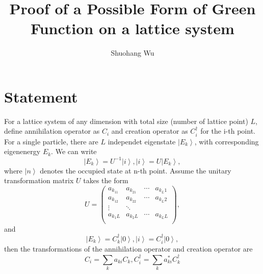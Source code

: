 \documentclass[prb,superscriptaddress,letter,10pt,onecolumn]{revtex4}
\begin{document}
\title{Proof of a Possible Form of Green Function on a lattice system}
\author{Shuohang Wu}

\maketitle

\section{Statement}

For a lattice system of any dimension with total size (number of lattice point) $L$, define annihilation operator as $C_i$ and creation operator as $C_i^\dagger$ for the i-th point.
For a single particle, there are $L$ independet eigenstate $\left|E_k\right>$, with corresponding eigenenergy $E_k$.
We can write
\begin{equation}
	\left|E_k\right> = U^{-1}\left|i\right>,
	\left|i\right> = U\left|E_k\right>,
\end{equation}
where $\left|n\right>$ denotes the occupied state at n-th point.
Assume the unitary transformation matrix $U$ takes the form
\begin{equation}
	U =       	
	\left(                 	
	\begin{array}{cccc}   		
		a_{k_11} & a_{k_21} & \cdots & a_{k_L1}\\  		
		a_{k_12} & a_{k_22} & \cdots & a_{k_L2}\\
		\vdots & \ddots &  & \\
		a_{k_1L} & a_{k_2L} & \cdots & a_{k_LL}\\  		
	\end{array}	
	\right),         	
\end{equation}
and
\begin{equation}
	\left|E_k\right> = C_k^\dagger\left|0\right>,
	\left|i\right> = C_i^\dagger\left|0\right>,
\end{equation}
then the transformations of the annihilation operator and creation operator are
\begin{equation}
	C_i = \sum_{k}a_{ki} C_k,
	C_i^\dagger = \sum_{k}a_{ki}^* C_k^\dagger
\end{equation}
\end{document}
